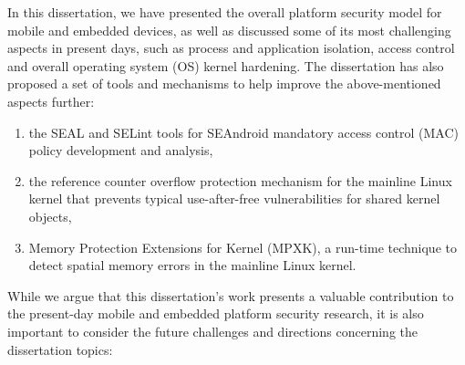 
In this dissertation, we have presented the overall platform security model for mobile and embedded devices, as well as discussed some of its most challenging aspects in present days, such as process and application isolation, access control and overall operating system (OS) kernel hardening.
The dissertation has also proposed a set of tools and mechanisms to help improve the above-mentioned aspects further: 
\begin{enumerate}
	\item the SEAL and SELint tools for SEAndroid mandatory access control (MAC) policy development and analysis,
	\item the reference counter overflow protection mechanism for the mainline Linux kernel that prevents typical use-after-free vulnerabilities for shared kernel objects,
	\item Memory Protection Extensions for Kernel (MPXK), a run-time technique to detect spatial memory errors in the mainline Linux kernel. 
\end{enumerate}

While we argue that this dissertation's work presents a valuable contribution to the present-day mobile and embedded platform security research, it is also important to consider the future challenges and directions concerning the dissertation topics:

